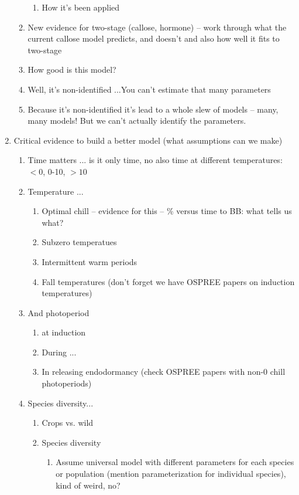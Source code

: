 \documentclass[11pt,letter]{article}
\begin{document}
\begin{enumerate}
\begin{enumerate}
\begin{enumerate}
\item How it's been applied
\end{enumerate}
\item New evidence for two-stage (callose, hormone) -- work through what the current callose model predicts, and doesn't and also how well it fits to two-stage
\item How good is this model? %
\item Well, it's non-identified ...You can't estimate that many parameters
\item Because it's non-identified it's lead to a whole slew of models -- many, many models! But we can't actually identify the parameters. 
\end{enumerate}
\item Critical evidence to build a better model (what assumptions can we make)
\begin{enumerate}
\item Time matters ... is it only time, no also time at different temperatures: $<0$, 0-10, $>10$
\item Temperature ... 
\begin{enumerate}
\item Optimal chill -- evidence for this -- \% versus time to BB: what tells us what? 
\item Subzero temperatues
\item Intermittent warm periods
\item Fall temperatures (don't forget we have OSPREE papers on induction temperatures)
\end{enumerate}
\item And photoperiod 
\begin{enumerate}
\item at induction
\item During ...
\item In releasing endodormancy (check OSPREE papers with non-0 chill photoperiods)
\end{enumerate} 
\item Species diversity... 
\begin{enumerate}
\item Crops vs. wild
\item Species diversity 
\begin{enumerate}
\item Assume universal model with different parameters for each species or population (mention parameterization for individual species), kind of weird, no?

\end{enumerate}
\end{enumerate}
\end{enumerate}
\end{enumerate}
\end{document}
